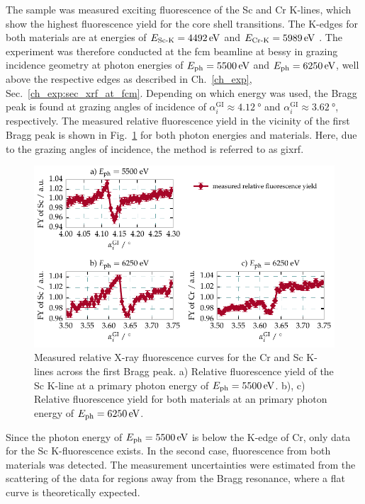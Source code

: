 The sample was measured exciting fluorescence of the Sc and Cr K-lines, which show the highest fluorescence yield for the core shell transitions. The K-edges for both materials are at energies of $E_\text{Sc-K} = \ev{4492}$ and $E_\text{Cr-K} = \ev{5989}$ \cite{elam_new_2002}. The experiment was therefore conducted at the \gls{fcm} beamline at \gls{bessy} in grazing incidence geometry at photon energies of $E_\text{ph} = \ev{5500}$ and $E_\text{ph} = \ev{6250}$, well above the respective edges as described in Ch.~\ref{ch_exp}, Sec.~\ref{ch_exp:sec_xrf_at_fcm}. Depending on which energy was used, the Bragg peak is found at grazing angles of incidence of $\alpha_i^\text{GI} \approx \SI{4.12}{\degree}$ and $\alpha_i^\text{GI} \approx \SI{3.62}{\degree}$, respectively. The measured relative fluorescence yield in the vicinity of the first Bragg peak is shown in Fig.~\ref{ch_spec:fig_CrSc_fluorescence_data} for both photon energies and materials. Here, due to the grazing angles of incidence, the method is referred to as \gls{gixrf}.
\begin{figure}[htbp]
  \centering
  \includegraphics[width=\textwidth]{img/CrSc_fluorescence_data}
  \caption[Measured relative X-ray fluorescence curves for the Cr and Sc K-lines across the first Bragg peak of the Cr/Sc sample.]{Measured relative X-ray fluorescence curves for the Cr and Sc K-lines across the first Bragg peak. a) Relative fluorescence yield of the Sc K-line at a primary photon energy of $E_\text{ph}=\ev{5500}$. b), c) Relative fluorescence yield for both materials at an primary photon energy of $E_\text{ph} = \ev{6250}$.}
  \label{ch_spec:fig_CrSc_fluorescence_data}
\end{figure}
Since the photon energy of $E_\text{ph} = \ev{5500}$ is below the K-edge of Cr, only data for the Sc K-fluorescence exists. In the second case, fluorescence from both materials was detected. The measurement uncertainties were estimated from the scattering of the data for regions away from the Bragg resonance, where a flat curve is theoretically expected.

